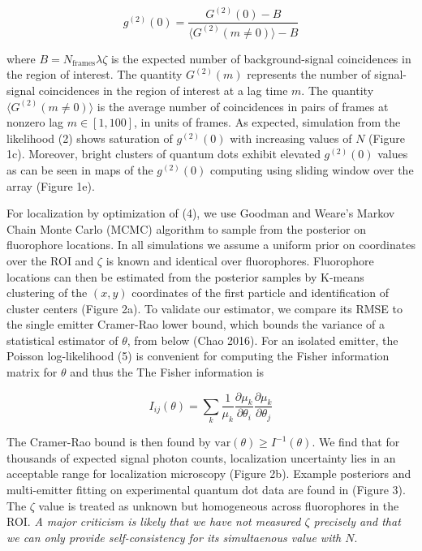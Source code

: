 \documentclass[a4paper, twocolumn, superscriptaddress,prl]{revtex4}  %
\begin{document}
\begin{equation}
g^{(2)}(0) = \frac{G^{(2)}(0)-B}{\langle G^{(2)}(m\neq 0)\rangle -B}
\end{equation}

where $B = N_{\mathrm{frames}}\lambda\zeta$ is the expected number of background-signal coincidences in the region of interest. The quantity $G^{(2)}(m)$ represents the number of signal-signal coincidences in the region of interest at a lag time $m$. The quantity $\langle G^{(2)}(m\neq 0)\rangle$ is the average number of coincidences in pairs of frames at nonzero lag $m \in [1,100]$, in units of frames. As expected, simulation from the likelihood (2) shows saturation of $g^{(2)}(0)$  with increasing values of $N$ (Figure 1c). Moreover, bright clusters of quantum dots exhibit elevated $g^{(2)}(0)$ values as can be seen in maps of the $g^{(2)}(0)$ computing using sliding window over the array (Figure 1e).

For localization by optimization of (4), we use Goodman and Weare's Markov Chain Monte Carlo (MCMC) algorithm \citep{Goodman2010} to sample from the posterior on fluorophore locations. In all simulations we assume a uniform prior on coordinates over the ROI and $\zeta$ is known and identical over fluorophores. Fluorophore locations can then be estimated from the posterior samples by K-means clustering of the $(x,y)$ coordinates of the first particle and identification of cluster centers (Figure 2a). To validate our estimator, we compare its RMSE to the single emitter Cramer-Rao lower bound, which bounds the variance of a statistical estimator of $\theta$, from below (Chao 2016). For an isolated emitter, the Poisson log-likelihood (5) is convenient for computing the Fisher information matrix for $\theta$ and thus the The Fisher information is \citep{Smith2010}

\begin{equation}
I_{ij}(\theta) = \sum_{k}\frac{1}{\mu_{k}}\frac{\partial \mu_{k}}{\partial\theta_{i}}\frac{\partial \mu_{k}}{\partial\theta_{j}}
\end{equation}

The Cramer-Rao bound is then found by $\mathrm{var}(\theta) \geq I^{-1}(\theta)$. We find that for thousands of expected signal photon counts, localization uncertainty lies in an acceptable range for localization microscopy (Figure 2b). Example posteriors and multi-emitter fitting on experimental quantum dot data are found in (Figure 3). The $\zeta$ value is treated as unknown but homogeneous across fluorophores in the ROI. \textit{A major criticism is likely that we have not measured $\zeta$ precisely and that we can only provide self-consistency for its simultaenous value with $N$}.
\end{document}
